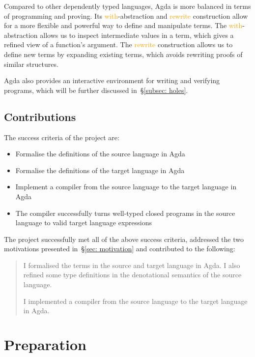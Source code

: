 \documentclass[12pt,a4paper]{report}
\makeatletter
\theoremstyle{definition}
\newcounter{motivation}
\newcommand{\secref}[1]{\S\ref{#1}}
\newcommand{\og}[1]{\textcolor{orange}{#1}}
\newcommand{\chapterminitoc}{%
  \begingroup
    \let\ps@plain\ps@empty %
    \let\ps@headings\ps@empty
    \minitoc
    \thispagestyle{empty} %
    \afterpage{\clearpage} %
  \endgroup
    \clearpage
  \addtocounter{page}{-1} %
}
\makeatother
\begin{document}
        Compared to other dependently typed languages, Agda is more balanced in terms of programming and proving. Its \og{\textsf{with}}-abstraction and \og{\textsf{rewrite}} construction allow for a more flexible and powerful way to define and manipulate terms. The \og{\textsf{with}}-abstraction allows us to inspect intermediate values in a term, which gives a refined view of a function's argument. The \og{\textsf{rewrite}} construction allows us to define new terms by expanding existing terms, which avoids rewriting proofs of similar structures.

        Agda also provides an interactive environment for writing and verifying programs, which will be further discussed in~\secref{subsec: holes}.

    \section{Contributions} \label{sec: contributions}
        The success criteria of the project are:
        \begin{itemize}
            \item 
                Formalise the definitions of the source language in Agda
            \item 
                Formalise the definitions of the target language in Agda
            \item
                Implement a compiler from the source language to the target language in Agda
            \item 
                The compiler successfully turns well-typed closed programs in the source language to valid target language expressions
        \end{itemize}

        The project successfully met all of the above success criteria, addressed the two motivations presented in~\secref{sec: motivation} and contributed to the following:
        \begin{quote}            
            \savedmotivationI
            I formalised the terms in the source and target language in Agda. I also refined some type definitions in the denotational semantics of the source language.
            
            \savedmotivationII
            I implemented a compiler from the source language to the target language in Agda. 
        \end{quote}



\chapter{Preparation}
    \chapterminitoc
\end{document}
